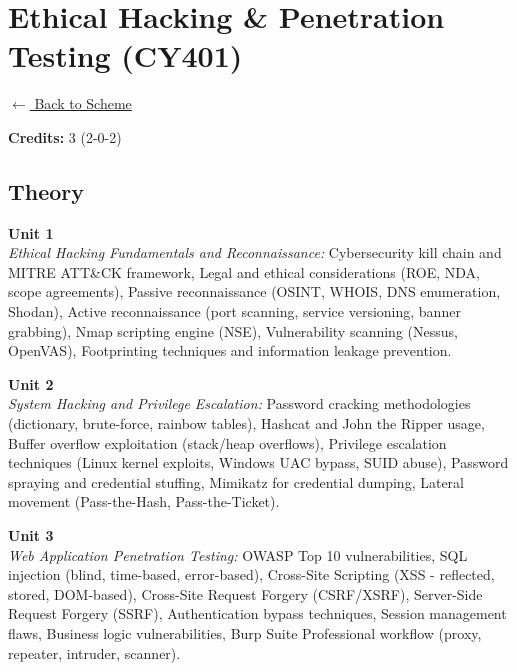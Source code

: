 \section*{Ethical Hacking \& Penetration Testing (CY401)}
\label{major:CS_4}

\noindent \small{\hyperref[main:scheme]{$\leftarrow$ Back to Scheme}} \vspace{0.5cm}

\noindent \textbf{Credits:} 3 (2-0-2)

\subsection*{Theory}
\noindent\textbf{Unit 1} \\
\textit{Ethical Hacking Fundamentals and Reconnaissance:} Cybersecurity kill chain and MITRE ATT\&CK framework, Legal and ethical considerations (ROE, NDA, scope agreements), Passive reconnaissance (OSINT, WHOIS, DNS enumeration, Shodan), Active reconnaissance (port scanning, service versioning, banner grabbing), Nmap scripting engine (NSE), Vulnerability scanning (Nessus, OpenVAS), Footprinting techniques and information leakage prevention.

\vspace{0.3cm}

\noindent\textbf{Unit 2} \\
\textit{System Hacking and Privilege Escalation:} Password cracking methodologies (dictionary, brute-force, rainbow tables), Hashcat and John the Ripper usage, Buffer overflow exploitation (stack/heap overflows), Privilege escalation techniques (Linux kernel exploits, Windows UAC bypass, SUID abuse), Password spraying and credential stuffing, Mimikatz for credential dumping, Lateral movement (Pass-the-Hash, Pass-the-Ticket).

\vspace{0.3cm}

\noindent\textbf{Unit 3} \\
\textit{Web Application Penetration Testing:} OWASP Top 10 vulnerabilities, SQL injection (blind, time-based, error-based), Cross-Site Scripting (XSS - reflected, stored, DOM-based), Cross-Site Request Forgery (CSRF/XSRF), Server-Side Request Forgery (SSRF), Authentication bypass techniques, Session management flaws, Business logic vulnerabilities, Burp Suite Professional workflow (proxy, repeater, intruder, scanner).

\vspace{0.3cm}

